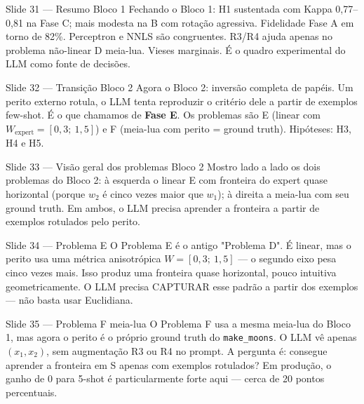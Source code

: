 \documentclass[aspectratio=169,10pt]{beamer}
\begin{document}
\begin{frame}{Slide 31 --- Resumo Bloco 1}
\footnotesize
Fechando o Bloco 1: H1 sustentada com Kappa 0{,}77--0{,}81 na Fase C; mais modesta na B com rota\c{c}\~ao agressiva. Fidelidade Fase A em torno de 82\%. Perceptron e NNLS s\~ao congruentes. R3/R4 ajuda apenas no problema n\~ao-linear D meia-lua. Vieses marginais. \'E o quadro experimental do LLM como fonte de decis\~oes.
\end{frame}

\begin{frame}{Slide 32 --- Transi\c{c}\~ao Bloco 2}
\footnotesize
Agora o Bloco 2: invers\~ao completa de pap\'eis. Um perito externo rotula, o LLM tenta reproduzir o crit\'erio dele a partir de exemplos few-shot. \'E o que chamamos de \textbf{Fase E}. Os problemas s\~ao E (linear com $W_{\text{expert}}=[0{,}3;\ 1{,}5]$) e F (meia-lua com perito = ground truth). Hip\'oteses: H3, H4 e H5.
\end{frame}

\begin{frame}{Slide 33 --- Vis\~ao geral dos problemas Bloco 2}
\footnotesize
Mostro lado a lado os dois problemas do Bloco 2: \`a esquerda o linear E com fronteira do expert quase horizontal (porque $w_2$ \'e cinco vezes maior que $w_1$); \`a direita a meia-lua com seu ground truth. Em ambos, o LLM precisa aprender a fronteira a partir de exemplos rotulados pelo perito.
\end{frame}

\begin{frame}{Slide 34 --- Problema E}
\footnotesize
O Problema E \'e o antigo "Problema D". \'E linear, mas o perito usa uma m\'etrica anisotr\'opica $W = [0{,}3;\ 1{,}5]$ --- o segundo eixo pesa cinco vezes mais. Isso produz uma fronteira quase horizontal, pouco intuitiva geometricamente. O LLM precisa CAPTURAR esse padr\~ao a partir dos exemplos --- n\~ao basta usar Euclidiana.
\end{frame}

\begin{frame}{Slide 35 --- Problema F meia-lua}
\footnotesize
O Problema F usa a mesma meia-lua do Bloco 1, mas agora o perito \'e o pr\'oprio ground truth do \texttt{make\_moons}. O LLM v\^e apenas $(x_1, x_2)$, sem augmenta\c{c}\~ao R3 ou R4 no prompt. A pergunta \'e: consegue aprender a fronteira em S apenas com exemplos rotulados? Em produ\c{c}\~ao, o ganho de 0 para 5-shot \'e particularmente forte aqui --- cerca de 20 pontos percentuais.
\end{frame}
\end{document}
